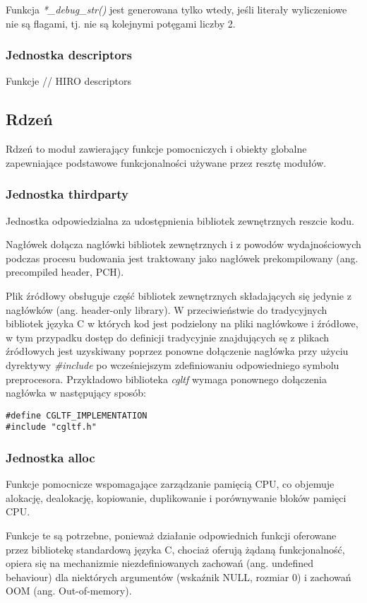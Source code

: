 Funkcja \textit{*\_debug\_str()} jest generowana tylko wtedy, jeśli literały wyliczeniowe nie są flagami, tj. nie są kolejnymi potęgami liczby 2.


\subsubsection{Jednostka descriptors}
Funkcje
// HIRO descriptors

\subsection{Rdzeń}

Rdzeń to moduł zawierający funkcje pomocniczych i obiekty globalne zapewniające podstawowe funkcjonalności używane przez resztę modułów.

\subsubsection{Jednostka thirdparty}
Jednostka odpowiedzialna za udostępnienia bibliotek zewnętrznych reszcie kodu.

Nagłówek dołącza nagłówki bibliotek zewnętrznych i z powodów wydajnościowych podczas procesu budowania jest traktowany jako nagłówek prekompilowany (ang. precompiled header, PCH).

Plik źródłowy obsługuje część bibliotek zewnętrznych składających się jedynie z nagłówków (ang. header-only library).
W przeciwieństwie do tradycyjnych bibliotek języka C w których kod jest podzielony na pliki nagłówkowe i źródłowe, w tym przypadku dostęp do definicji tradycyjnie znajdujących sę z plikach źródłowych jest uzyskiwany poprzez ponowne dołączenie nagłówka przy użyciu dyrektywy \textit{\#include} po wcześniejszym zdefiniowaniu odpowiedniego symbolu preprocesora.
Przykładowo biblioteka \textit{cgltf} wymaga ponownego dołączenia nagłówka w następujący sposób:
\lstset{language=C}
\begin{lstlisting}
#define CGLTF_IMPLEMENTATION
#include "cgltf.h"
\end{lstlisting}

\subsubsection{Jednostka alloc}
Funkcje pomocnicze wspomagające zarządzanie pamięcią CPU, co objemuje alokację, dealokację, kopiowanie, duplikowanie i porównywanie bloków pamięci CPU.

Funkcje te są potrzebne, ponieważ działanie odpowiednich funkcji oferowane przez bibliotekę standardową języka C, chociaż oferują żądaną funkcjonalność, opiera się na mechanizmie niezdefiniowanych zachowań (ang. undefined behaviour) dla niektórych argumentów (wskaźnik NULL, rozmiar 0) i zachowań OOM (ang. Out-of-memory).

